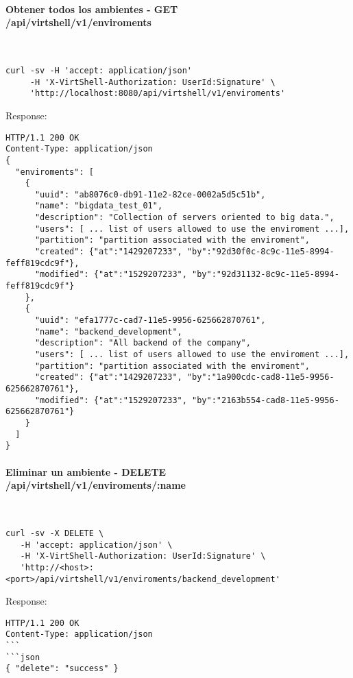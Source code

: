 \paragraph{Obtener todos los ambientes - GET \\ /api/virtshell/v1/enviroments} ~\\

\begin{lstlisting}[style=json]
curl -sv -H 'accept: application/json' 
     -H 'X-VirtShell-Authorization: UserId:Signature' \ 
     'http://localhost:8080/api/virtshell/v1/enviroments'
\end{lstlisting}

Response:

\begin{lstlisting}[style=json]
HTTP/1.1 200 OK
Content-Type: application/json
{
  "enviroments": [
    {
      "uuid": "ab8076c0-db91-11e2-82ce-0002a5d5c51b",
      "name": "bigdata_test_01",
      "description": "Collection of servers oriented to big data.", 
      "users": [ ... list of users allowed to use the enviroment ...],
      "partition": "partition associated with the enviroment",
      "created": {"at":"1429207233", "by":"92d30f0c-8c9c-11e5-8994-feff819cdc9f"},
      "modified": {"at":"1529207233", "by":"92d31132-8c9c-11e5-8994-feff819cdc9f"}
    },
    { 
      "uuid": "efa1777c-cad7-11e5-9956-625662870761",
      "name": "backend_development",
      "description": "All backend of the company", 
      "users": [ ... list of users allowed to use the enviroment ...],
      "partition": "partition associated with the enviroment",      
      "created": {"at":"1429207233", "by":"1a900cdc-cad8-11e5-9956-625662870761"},
      "modified": {"at":"1529207233", "by":"2163b554-cad8-11e5-9956-625662870761"}
    }    
  ]
}   
\end{lstlisting}

\paragraph{Eliminar un ambiente - DELETE \\ /api/virtshell/v1/enviroments/:name} ~\\

\begin{lstlisting}[style=json]
curl -sv -X DELETE \
   -H 'accept: application/json' \
   -H 'X-VirtShell-Authorization: UserId:Signature' \
   'http://<host>:<port>/api/virtshell/v1/enviroments/backend_development'
\end{lstlisting}

Response:

\begin{lstlisting}[style=json]
HTTP/1.1 200 OK
Content-Type: application/json
```
```json
{ "delete": "success" }
\end{lstlisting}